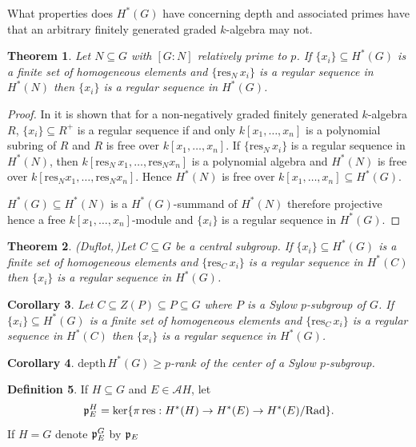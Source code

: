 \documentclass[reqno]{amsart}
\theoremstyle{plain}%
\newtheorem{thm}{Theorem}[section]
\newtheorem{cor}[thm]{Corollary}
\theoremstyle{definition}
\newtheorem{defn}[thm]{Definition}
\theoremstyle{remark}
\newcommand\sub{\subseteq}
\newcommand\dph{\text{depth}\,}
\newcommand\fg{finitely generated }
\newcommand\res{\text{res}}
\begin{document}
What properties does $H^*(G)$ have concerning depth and associated primes have that an arbitrary \fg graded $k$-algebra may not.

\begin{thm} Let $N\sub G$ with $[G:N]$ relatively prime to $p$. If $\{x_i\}\sub H^*(G)$ is a finite set of homogeneous elements and $\{\text{res}_N\,x_i\}$ is a regular sequence in $H^*(N)$ then $\{x_i\}$ is a regular sequence in $H^*(G)$.\end{thm}
\begin{proof} In \cite{Kap} it is shown that for a non-negatively graded \fg $k$-algebra $R$, $\{x_i\}\sub R^+$ is a regular sequence if and only $k[x_1,\dots,x_n]$ is a polynomial subring of $R$ and $R$ is free over $k[x_1,\dots,x_n]$. If $\{\text{res}_N\,x_i\}$ is a regular sequence in $H^*(N)$, then $k[\res_N\,x_1,\dots,\res_Nx_n]$ is a polynomial algebra and $H^*(N)$ is free over $k[\res_Nx_1,\dots,\res_Nx_n]$. Hence $H^*(N)$ is free over $k[x_1,\dots,x_n]\sub H^*(G)$.
 
$H^*(G)\sub H^*(N)$ is a $H^*(G)$-summand of $H^*(N)$ therefore projective hence a free $k[x_1,\dots,x_n]$-module and $\{x_i\}$ is a regular sequence in $H^*(G)$.\end{proof}

\begin{thm}(Duflot,\,\cite{D})\label{Duf} Let $C\sub G$ be a central subgroup. If $\{x_i\}\sub H^*(G)$ is a finite set of homogeneous elements and $\{\text{res}_C\,x_i\}$ is a regular sequence in $H^*(C)$ then $\{x_i\}$ is a regular sequence in $H^*(G)$.\end{thm}

\begin{cor} Let $C\sub Z(P)\sub P\sub G$ where $P$ is a Sylow $p$-subgroup of $G$.  If $\{x_i\}\sub H^*(G)$ is a finite set of homogeneous elements and $\{\text{res}_C\,x_i\}$ is a regular sequence in $H^*(C)$ then $\{x_i\}$ is a regular sequence in $H^*(G)$.\end{cor}

\begin{cor} $\dph H^*(G)\geq p$-rank of the center of a Sylow $p$-subgroup.\end{cor}

\begin{defn} If $H\sub G$ and $E\in\mathcal AH$, let \
$$\frak p_E^H=\ker\{\pi\,\res:H^*(H)\to H^*(E)\to H^*(E)/\text{Rad}\}.$$
If $H=G$ denote $\frak p_E^G$ by $\frak p_E$
\end{defn}
\end{document}
